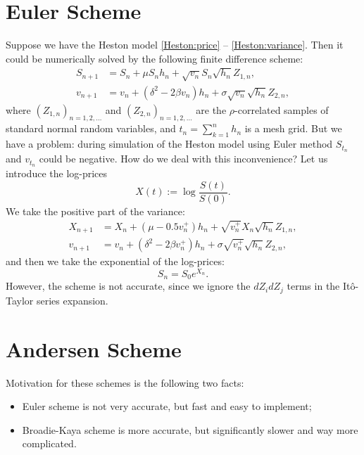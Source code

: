     \section{Euler Scheme}
        Suppose we have the Heston model \eqref{Heston:price} -- \eqref{Heston:variance}. Then it could be numerically solved by the following finite difference scheme:
        \begin{align}
            S_{n+1} & = S_n + \mu S_n h_n + \sqrt{v_n} S_n \sqrt{h_n} Z_{1,n}, \label{Euler:Heston:price}\\
            v_{n+1} & = v_n + \left(\delta^2 - 2\beta v_n\right) h_n + \sigma \sqrt{v_n} \sqrt{h_n} Z_{2,n}, \label{Euler:Heston:variance}
        \end{align}
        where $(Z_{1,n})_{n=1, 2, \dots}$ and $(Z_{2,n})_{n=1, 2, \dots}$ are the $\rho$-correlated samples of standard normal random variables, and $t_n = \sum_{k=1}^n h_n$ is a mesh grid.
        But we have a problem: during simulation of the Heston model using Euler method $S_{t_n}$ and $v_{t_n}$ could be negative. How do we deal with this inconvenience?
        Let us introduce the log-prices
        \begin{equation}
            X(t) := \log\frac{S(t)}{S(0)}.
        \end{equation}
        We take the positive part of the variance:
        \begin{align}
            X_{n+1} & = X_n + (\mu - 0.5 v_n^+)h_n + \sqrt{v_n^+} X_n \sqrt{h_n} Z_{1,n}, \label{Euler:Heston:price:posmod}\\
            v_{n+1} & = v_n + \left(\delta^2 - 2\beta v_n^+\right) h_n + \sigma \sqrt{v_n^+} \sqrt{h_n} Z_{2,n}, \label{Euler:Heston:variance:posmod}
        \end{align}
        and then we take the exponential of the log-prices:
        \begin{equation}
            S_{n} = S_0 e^{X_{n}}.
        \end{equation}
        However, the scheme is not accurate, since we ignore the $dZ_idZ_j$ terms in the It\^o-Taylor series expansion.

    \section{Andersen Scheme}
        Motivation for these schemes is the following two facts:
        \begin{itemize}
            \item Euler scheme is not very accurate, but fast and easy to implement;
            \item Broadie-Kaya scheme is more accurate, but significantly slower and way more complicated.
        \end{itemize}
